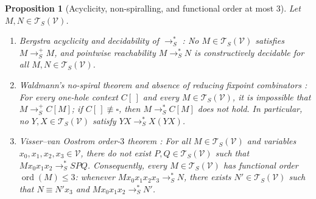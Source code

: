 \documentclass[11pt,reqno]{amsart}
\numberwithin{equation}{section}
\theoremstyle{plain}
\newtheorem{proposition}[theorem]{Proposition}
\theoremstyle{definition}
\theoremstyle{remark}
\DeclareMathOperator{\ord}{ord}
\newcommand{\TSV}{\mathcal{T}_S(\mathcal{V})}
\newcommand{\redSp}{\to_S^+}
\newcommand{\redSs}{\to_S^*}
\begin{document}
\begin{proposition}[Acyclicity, non-spiralling, and functional order at most $3$]\label{prop:acyclicity-order}
Let $M, N \in \TSV$.
\begin{enumerate}[label=(\roman*),leftmargin=2.2em]
  \item \emph{Bergstra acyclicity and decidability of $\redSs$ \cite{KlopVanOostromVanRaamsdonk2007,BarendregtEndrullisKlopWaldmann2017}:} No $M \in \TSV$ satisfies $M \redSp M$, and pointwise reachability $M \redSs N$ is constructively decidable for all $M, N \in \TSV$.
  \item \emph{Waldmann's no-spiral theorem and absence of reducing fixpoint combinators \cite{Waldmann2000,BarendregtEndrullisKlopWaldmann2017}:} For every one-hole context $C[\,]$ and every $M \in \TSV$, it is impossible that $M \redSp C[M]$; if $C[\,] \not\equiv \square$, then $M \redSs C[M]$ does not hold. In particular, no $Y, X \in \TSV$ satisfy $Y X \redSs X(Y X)$.
  \item \emph{Visser--van Oostrom order-$3$ theorem \cite{BarendregtEndrullisKlopWaldmann2017}:} For all $M \in \TSV$ and variables $x_0, x_1, x_2, x_3 \in \mathcal{V}$, there do not exist $P, Q \in \TSV$ such that $M x_0 x_1 x_2 \redSs S P Q$. Consequently, every $M \in \TSV$ has functional order $\ord(M) \le 3$: whenever $M x_0 x_1 x_2 x_3 \redSs N$, there exists $N' \in \TSV$ such that $N \equiv N' x_3$ and $M x_0 x_1 x_2 \redSs N'$.
\end{enumerate}
\end{proposition}
\end{document}
